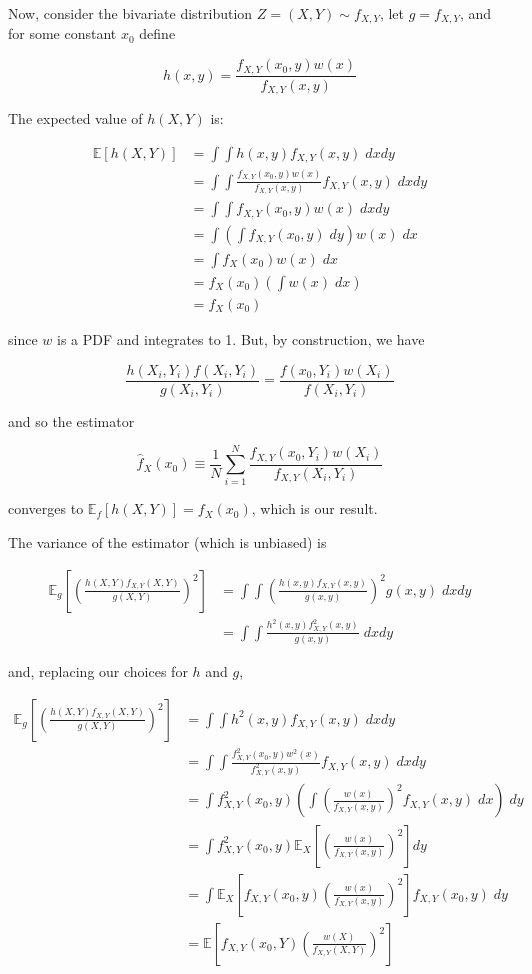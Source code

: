 Now, consider the bivariate distribution \(Z = (X, Y) \sim f_{X, Y}\),
let \(g = f_{X, Y}\), and for some constant \(x_0\) define

\[ h(x, y) = \frac{f_{X, Y}(x_0, y) w(x) }{ f_{X, Y}(x, y) } \]

The expected value of \(h(X, Y)\) is:

\[
\begin{align}
\mathbb{E}[h(X, Y)] &= \int \int h(x, y) f_{X, Y}(x, y) \; dx dy \\
&= \int \int \frac{f_{X, Y}(x_0, y) w(x)}{f_{X, Y}(x, y)} f_{X, Y}(x, y) \; dx dy \\
&= \int \int f_{X, Y}(x_0, y) w(x) \; dx dy \\
&= \int \left(\int f_{X, Y}(x_0, y) \; dy \right) w(x) \; dx \\
&= \int f_X(x_0) w(x) \; dx \\
&= f_X(x_0) \left( \int w(x) \; dx \right) \\
&= f_X(x_0)
\end{align}
\]

since \(w\) is a PDF and integrates to 1. But, by construction, we have

\[ 
\frac{h(X_i, Y_i) f(X_i, Y_i)}{g(X_i, Y_i)}
=
\frac{f(x_0, Y_i) w(X_i)}{f(X_i, Y_i)}
\]

and so the estimator

\[ \hat{f}_X(x_0) \equiv \frac{1}{N} \sum_{i=1}^N \frac{f_{X, Y}(x_0, Y_i)  w(X_i)}{f_{X, Y}(X_i, Y_i)} \]

converges to \(\mathbb{E}_f[h(X, Y)] = f_X(x_0)\), which is our result.

The variance of the estimator (which is unbiased) is

\[
\begin{align}
\mathbb{E}_g\left[ \left(\frac{h(X, Y) f_{X, Y}(X, Y)}{g(X, Y)} \right)^2 \right]
&= \int \int \left( \frac{h(x, y) f_{X, Y}(x, y)}{g(x, y)} \right)^2 g(x, y) \; dx dy \\
&= \int \int \frac{h^2(x, y) f_{X, Y}^2(x, y)}{g(x, y)} \; dx dy
\end{align}
\]

and, replacing our choices for \(h\) and \(g\),

\[
\begin{align}
\mathbb{E}_g\left[ \left(\frac{h(X, Y) f_{X, Y}(X, Y)}{g(X, Y)} \right)^2 \right]
&= \int \int h^2(x, y) f_{X, Y}(x, y) \; dx dy \\
&= \int \int \frac{f_{X, Y}^2(x_0, y) w^2(x) }{ f_{X, Y}^2(x, y) } f_{X, Y}(x, y) \; dx dy \\
&= \int f_{X, Y}^2(x_0, y) \left( \int \left(\frac{w(x)}{f_{X, Y}(x, y)}\right)^2 f_{X, Y}(x, y) \; dx \right) \; dy \\
&= \int f_{X, Y}^2(x_0, y) \mathbb{E}_X\left[ \left(\frac{w(x)}{f_{X, Y}(x, y)}\right)^2 \right] dy \\
&= \int \mathbb{E}_X\left[ f_{X, Y}(x_0, y) \left(\frac{w(x)}{f_{X, Y}(x, y)}\right)^2 \right] f_{X, Y}(x_0, y) \; dy \\
&= \mathbb{E} \left[  f_{X, Y}(x_0, Y) \left(\frac{w(X)}{f_{X, Y}(X, Y)}\right)^2 \right]
\end{align}
\]

